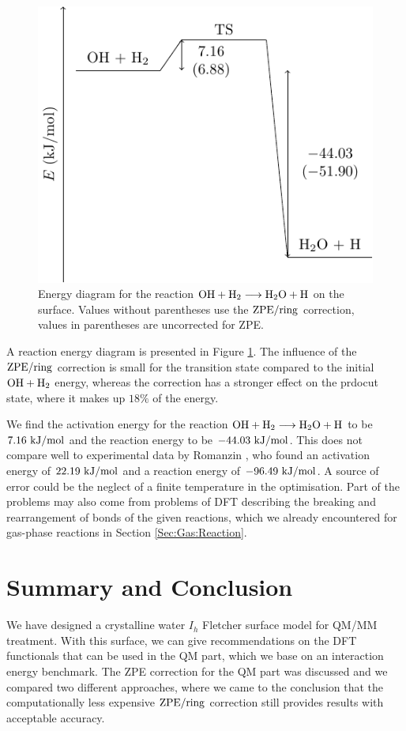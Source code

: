 \documentclass[8.5pt,twoside,twocolumn]{article}
\newcommand\zpe{\enmat{\te{ZPE}}}
\newcommand\zpering{\enmat{\zpe/\te{ring}}}
\newcommand\kmo{\enmat{\te {kJ/mol}}}
\theoremstyle{standard}
\begin{document}
\begin{figure}[t!]
\includegraphics[width=.49\textwidth]{TikzPics/TikzCreation/HO.H2.Activation/HOH2Activation.pdf}
\caption{Energy diagram for the reaction $\text O \text H + \text H_2 \longrightarrow \text H _2 \text O + \text H$ on
the surface. Values without parentheses use the $\zpering$ correction, values in
parentheses are uncorrected for ZPE.}
\label{Fig:Adv:ReactionEnergyDiagram}
\end{figure}

A reaction energy diagram is presented in Figure
\ref{Fig:Adv:ReactionEnergyDiagram}. The influence of the
$\zpering$ correction is small for the transition state compared to the initial
$\text O \text H + \text H_2$ energy, whereas the correction has a stronger effect on the prdocut
state, where it makes up $18\%$ of the energy.

We find the activation energy for the reaction \mbox{$\text O \text H + \text H_2 \longrightarrow \text H _2 \text O +
\text H$} to be $7.16~\kmo$ and the reaction energy to be $-44.03~\kmo$. This does
not compare well to experimental data by Romanzin
\etal\cite{RomanzinIoppoloCuppenEtAl2011}, who found an activation energy of
$22.19~\kmo$ and a reaction energy of $-96.49~\kmo$. A source of error could be
the neglect of a finite temperature in the optimisation. Part of the problems
may also come from problems of DFT describing the breaking and rearrangement of
bonds of the given reactions, which we already encountered for gas-phase
reactions in Section \ref{Sec:Gas:Reaction}.


\section{Summary and Conclusion}
\label{Sec:Con}
We have designed a crystalline water $I_h$ Fletcher surface model for QM/MM
treatment. With this surface, we can give recommendations on the DFT functionals
that can be used in the QM part, which we base on an interaction energy
benchmark. The ZPE correction for the QM part was discussed and we compared
two different approaches, where we came to the conclusion that the
computationally less expensive $\zpering$ correction still provides results with
acceptable accuracy.
\end{document}
